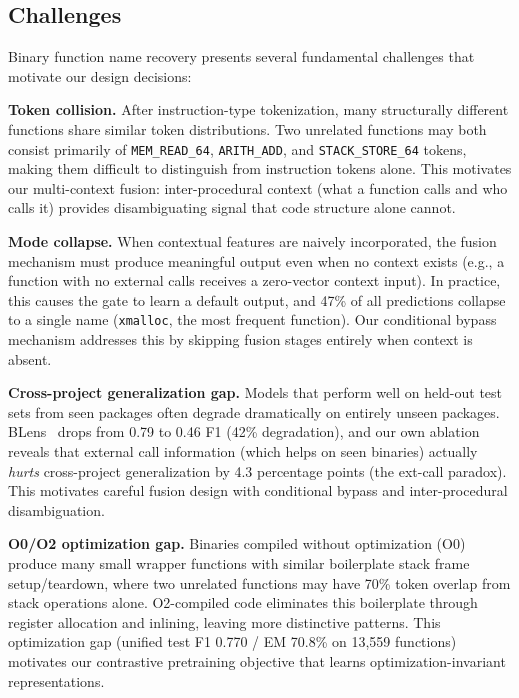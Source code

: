 \documentclass[sigconf,nonacm]{acmart}
\begin{document}
\subsection{Challenges}
\label{sec:challenges}

Binary function name recovery presents several fundamental challenges that motivate our design decisions:

\textbf{Token collision.} After instruction-type tokenization, many structurally different functions share similar token distributions. Two unrelated functions may both consist primarily of \texttt{MEM\_READ\_64}, \texttt{ARITH\_ADD}, and \texttt{STACK\_STORE\_64} tokens, making them difficult to distinguish from instruction tokens alone. This motivates our multi-context fusion: inter-procedural context (what a function calls and who calls it) provides disambiguating signal that code structure alone cannot.

\textbf{Mode collapse.} When contextual features are naively incorporated, the fusion mechanism must produce meaningful output even when no context exists (e.g., a function with no external calls receives a zero-vector context input). In practice, this causes the gate to learn a default output, and 47\% of all predictions collapse to a single name (\texttt{xmalloc}, the most frequent function). Our conditional bypass mechanism addresses this by skipping fusion stages entirely when context is absent.

\textbf{Cross-project generalization gap.} Models that perform well on held-out test sets from seen packages often degrade dramatically on entirely unseen packages. BLens~\cite{blens} drops from 0.79 to 0.46 F1 (42\% degradation), and our own ablation reveals that external call information (which helps on seen binaries) actually \emph{hurts} cross-project generalization by 4.3 percentage points (the ext-call paradox). This motivates careful fusion design with conditional bypass and inter-procedural disambiguation.

\textbf{O0/O2 optimization gap.} Binaries compiled without optimization (O0) produce many small wrapper functions with similar boilerplate stack frame setup/teardown, where two unrelated functions may have 70\% token overlap from stack operations alone. O2-compiled code eliminates this boilerplate through register allocation and inlining, leaving more distinctive patterns. This optimization gap (unified test F1 0.770 / EM 70.8\% on 13,559 functions) motivates our contrastive pretraining objective that learns optimization-invariant representations.
\end{document}
